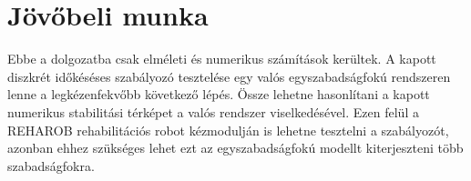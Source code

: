 \chapter{Jövőbeli munka}\label{chap:conclusion}

Ebbe a dolgozatba csak elméleti és numerikus számítások kerültek. A kapott 
diszkrét időkéséses szabályozó tesztelése egy valós egyszabadságfokú rendszeren 
lenne a legkézenfekvőbb következő lépés. Össze lehetne hasonlítani a kapott 
numerikus stabilitási térképet a valós rendszer viselkedésével. Ezen felül 
a REHAROB rehabilitációs robot kézmodulján is lehetne tesztelni a szabályozót, azonban 
ehhez szükséges lehet ezt az egyszabadságfokú modellt kiterjeszteni több szabadságfokra.